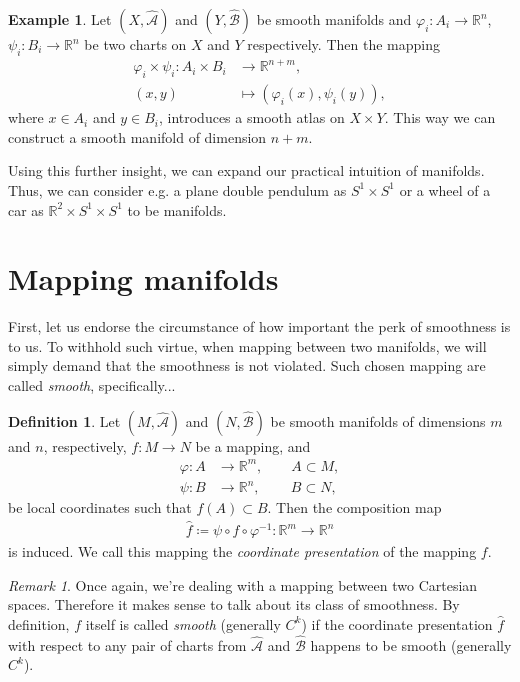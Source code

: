 \documentclass[a4paper,11pt]{article}
\theoremstyle{theorem}
\theoremstyle{remark}
\newtheorem*{remark}{Remark}
\theoremstyle{definition}
\newtheorem{definition}{Definition}
\newtheorem*{example}{Example}
\begin{document}
		\begin{example}
			Let $(X,\hat{\mathcal A})$ and $(Y,\hat{\mathcal B})$ be smooth manifolds and $\varphi_i : A_i \to \mathbb R^n$, $\psi_i: B_i \to \mathbb R^n$ be two charts on $X$ and $Y$ respectively. Then the mapping
			\begin{align*}
				\varphi_i \times \psi_i : A_i \times B_i &\to \mathbb R^{n+m},
			\\
				(x,y) &\mapsto (\varphi_i(x), \psi_i(y)),
			\end{align*}
			where $x \in A_i$ and $y \in B_i$, introduces a smooth atlas on $X \times Y$. This way we can construct a smooth manifold of dimension $n+m$.
			
			Using this further insight, we can expand our practical intuition of manifolds. Thus, we can consider e.g. a plane double pendulum as $S^1 \times S^1$ or a wheel of a car as $\mathbb R^2 \times S^1 \times S^1$ to be manifolds.
		\end{example}

	\section{Mapping manifolds}
	
		First, let us endorse the circumstance of how important the perk of smoothness is to us. To withhold such virtue, when mapping between two manifolds, we will simply demand that the smoothness is not violated. Such chosen mapping are called \emph{smooth}, specifically...
		\begin{definition}
			Let $(M, \hat{\mathcal A})$ and $(N, \hat{\mathcal B})$ be smooth manifolds of dimensions $m$ and $n$, respectively, $f: M \to N$ be a mapping, and
			\begin{align*}
				\varphi: A &\to \mathbb R^m, \qquad A \subset M,
			\\
				\psi: B &\to \mathbb R^n, \qquad\, B \subset N,
			\end{align*}
			be local coordinates such that $f(A) \subset B$. Then the composition map
			\begin{align*}
				\hat f \coloneqq \psi \circ f \circ \varphi^{-1}: \mathbb R^m \to \mathbb R^n
			\end{align*}
			is induced. We call this mapping the \emph{coordinate presentation} of the mapping $f$.
		\end{definition}
	
		\begin{remark}
			Once again, we're dealing with a mapping between two Cartesian spaces. Therefore it makes sense to talk about its class of smoothness. By definition, $f$ itself is called \emph{smooth} (generally $C^k$) if the coordinate presentation $\hat f$ with respect to any pair of charts from $\hat{\mathcal A}$ and $\hat{\mathcal B}$ happens to be smooth (generally $C^k$).
		\end{remark}
	
\end{document}
